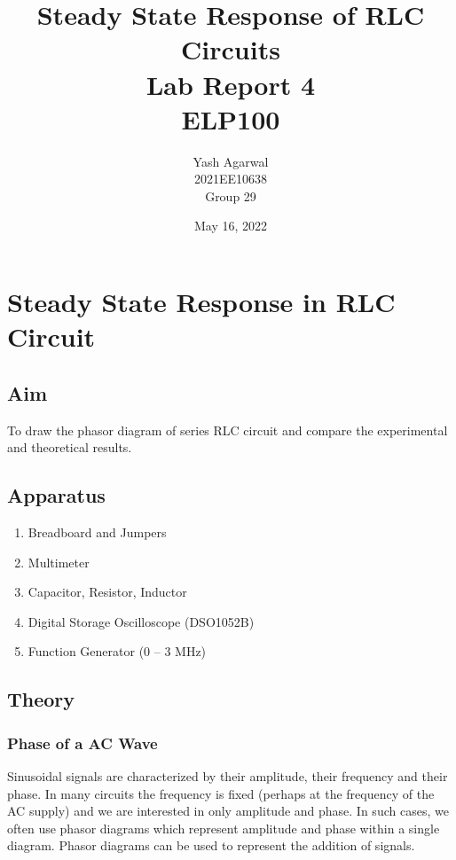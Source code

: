 \documentclass{article}
\title{Steady State Response of	RLC	Circuits \\ Lab Report 4 \\ ELP100}
\author{Yash Agarwal \\ 2021EE10638 \\ Group 29}
\date{May 16, 2022}
\begin{document}
\pagecolor{yellow!15}
\maketitle
\vspace{15px}
\tableofcontents
{}
\newpage
\section{Steady State Response in RLC Circuit}
\subsection{Aim}
To draw the phasor diagram of series RLC circuit and compare the experimental and theoretical results.
\subsection{Apparatus}
\begin{enumerate}
\item Breadboard and Jumpers
\item Multimeter
\item Capacitor, Resistor, Inductor
\item Digital Storage Oscilloscope (DSO1052B)
\item Function Generator (0 – 3 MHz)
\end{enumerate}

\subsection{Theory}
\vspace{5px}
\subsubsection{Phase of a AC Wave}
\begin{figure}
\end{figure}
Sinusoidal signals are characterized by their amplitude, their frequency and their phase. In many circuits the frequency is fixed (perhaps at the frequency of the AC supply) and we are interested in only amplitude and phase. In such cases, we often use phasor diagrams which represent amplitude and phase within a single diagram. Phasor diagrams can be used to represent the addition of signals.
\end{document}
